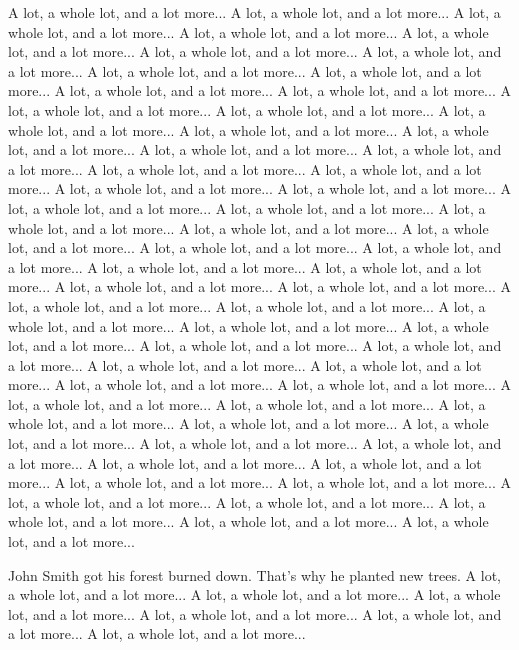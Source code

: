 \documentclass[landscape,a0b,final,a4resizeable]{include/a0poster}
\begin{document}
\begin{poster}
\begin{multicols}{3}
 A lot, a whole lot, and a lot more... A lot, a whole lot, and a lot more... A lot, a whole lot, and a lot more... A lot, a whole lot, and a lot more... A lot, a whole lot, and a lot more... A lot, a whole lot, and a lot more... A lot, a whole lot, and a lot more... A lot, a whole lot, and a lot more... A lot, a whole lot, and a lot more... A lot, a whole lot, and a lot more... A lot, a whole lot, and a lot more... A lot, a whole lot, and a lot more... A lot, a whole lot, and a lot more... A lot, a whole lot, and a lot more... A lot, a whole lot, and a lot more... A lot, a whole lot, and a lot more... A lot, a whole lot, and a lot more... A lot, a whole lot, and a lot more... A lot, a whole lot, and a lot more... A lot, a whole lot, and a lot more... A lot, a whole lot, and a lot more... A lot, a whole lot, and a lot more... A lot, a whole lot, and a lot more... A lot, a whole lot, and a lot more... A lot, a whole lot, and a lot more... A lot, a whole lot, and a lot more... A lot, a whole lot, and a lot more... A lot, a whole lot, and a lot more... A lot, a whole lot, and a lot more... A lot, a whole lot, and a lot more... A lot, a whole lot, and a lot more... A lot, a whole lot, and a lot more... A lot, a whole lot, and a lot more... A lot, a whole lot, and a lot more... A lot, a whole lot, and a lot more... A lot, a whole lot, and a lot more... A lot, a whole lot, and a lot more... A lot, a whole lot, and a lot more... A lot, a whole lot, and a lot more... A lot, a whole lot, and a lot more... A lot, a whole lot, and a lot more... A lot, a whole lot, and a lot more... A lot, a whole lot, and a lot more... A lot, a whole lot, and a lot more... A lot, a whole lot, and a lot more... A lot, a whole lot, and a lot more... A lot, a whole lot, and a lot more... A lot, a whole lot, and a lot more... A lot, a whole lot, and a lot more... A lot, a whole lot, and a lot more... A lot, a whole lot, and a lot more... A lot, a whole lot, and a lot more... A lot, a whole lot, and a lot more... A lot, a whole lot, and a lot more... A lot, a whole lot, and a lot more... A lot, a whole lot, and a lot more... A lot, a whole lot, and a lot more... A lot, a whole lot, and a lot more... A lot, a whole lot, and a lot more... A lot, a whole lot, and a lot more...
\newpage

John Smith got his forest burned down.
That's why he planted new trees.
A lot, a whole lot, and a lot more...
A lot, a whole lot, and a lot more...
A lot, a whole lot, and a lot more...
A lot, a whole lot, and a lot more...
A lot, a whole lot, and a lot more...
A lot, a whole lot, and a lot more...



\end{multicols}
\end{poster}
\end{document}
